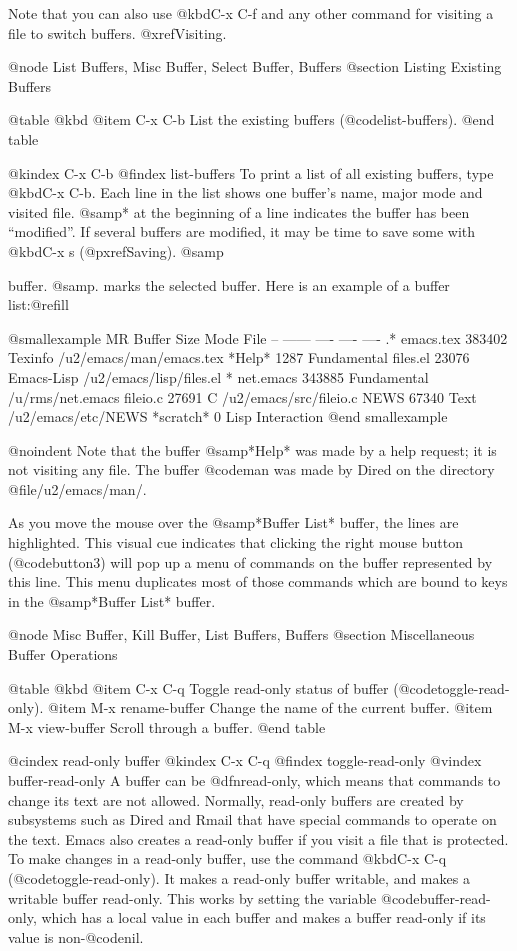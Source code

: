 {{{{{{{{{{{{{{{{{{{  Note that you can also use @kbd{C-x C-f} and any other command for
visiting a file to switch buffers.  @xref{Visiting}.

@node List Buffers, Misc Buffer, Select Buffer, Buffers
@section Listing Existing Buffers

@table @kbd
@item C-x C-b
List the existing buffers (@code{list-buffers}).
@end table

@kindex C-x C-b
@findex list-buffers
  To print a list of all existing buffers, type @kbd{C-x C-b}.  Each
line in the list shows one buffer's name, major mode and visited file.
@samp{*} at the beginning of a line indicates the buffer has been
``modified''.  If several buffers are modified, it may be time to save
some with @kbd{C-x s} (@pxref{Saving}).  @samp{%
buffer.  @samp{.} marks the selected buffer.  Here is an example of a
buffer list:@refill

@smallexample
 MR Buffer         Size  Mode           File
 -- ------         ----  ----           ----
.*  emacs.tex      383402 Texinfo       /u2/emacs/man/emacs.tex
    *Help*         1287  Fundamental	
    files.el       23076 Emacs-Lisp     /u2/emacs/lisp/files.el
 *%
    net.emacs      343885 Fundamental   /u/rms/net.emacs
    fileio.c       27691 C              /u2/emacs/src/fileio.c
    NEWS           67340 Text           /u2/emacs/etc/NEWS
    *scratch*	   0	 Lisp Interaction
@end smallexample

@noindent
Note that the buffer @samp{*Help*} was made by a help request; it is not
visiting any file.  The buffer @code{man} was made by Dired on the
directory @file{/u2/emacs/man/}.

As you move the mouse over the @samp{*Buffer List*} buffer, the lines
are highlighted.  This visual cue indicates that clicking the right
mouse button (@code{button3}) will pop up a menu of commands on the
buffer represented by this line.  This menu duplicates most of those
commands which are bound to keys in the @samp{*Buffer List*} buffer.

@node Misc Buffer, Kill Buffer, List Buffers, Buffers
@section Miscellaneous Buffer Operations

@table @kbd
@item C-x C-q
Toggle read-only status of buffer (@code{toggle-read-only}).
@item M-x rename-buffer
Change the name of the current buffer.
@item M-x view-buffer
Scroll through a buffer.
@end table

@cindex read-only buffer
@kindex C-x C-q
@findex toggle-read-only
@vindex buffer-read-only
  A buffer can be @dfn{read-only}, which means that commands to change
its text are not allowed.  Normally, read-only buffers are created by
subsystems such as Dired and Rmail that have special commands to operate
on the text.  Emacs also creates a read-only buffer if you
visit a file that is protected.  To make changes in a read-only buffer,
use the command @kbd{C-x C-q} (@code{toggle-read-only}).  It makes a
read-only buffer writable, and makes a writable buffer read-only.  This
works by setting the variable @code{buffer-read-only}, which has a local
value in each buffer and makes a buffer read-only if its value is
non-@code{nil}.

}}}}}}}}}}}}}}}}}}}}
